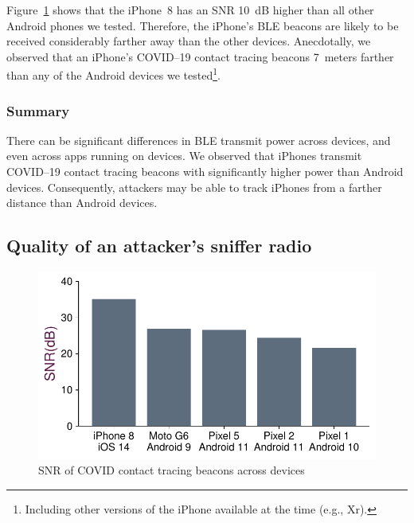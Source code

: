 Figure~\ref{fig:txpwr} shows that the iPhone~8 has an SNR 10~dB higher
than all other Android phones we tested. Therefore, the iPhone's BLE beacons
are likely to be received considerably farther away than the other devices.
Anecdotally, we observed that an iPhone's COVID--19 contact tracing beacons
7~meters farther than any of the Android devices we tested\footnote{Including other versions of the iPhone available at the time (e.g., Xr).}.

\subsubsection*{Summary} There can be significant differences in BLE transmit power
across devices, and even across apps running on devices. We observed
that iPhones transmit COVID--19 contact tracing beacons with significantly higher
power than Android devices.  Consequently, attackers may be able to track
iPhones from a farther distance than Android devices.

\subsection{Quality of an attacker's sniffer radio} %
    \label{sec:hadi:sdr}

\begin{figure}
    \centering
    \includegraphics[width=\linewidth]{bletracking/plots/phone_power_barplot}
    \caption{SNR of COVID contact tracing beacons across devices}
    \label{fig:txpwr}
    \end{figure}
    

